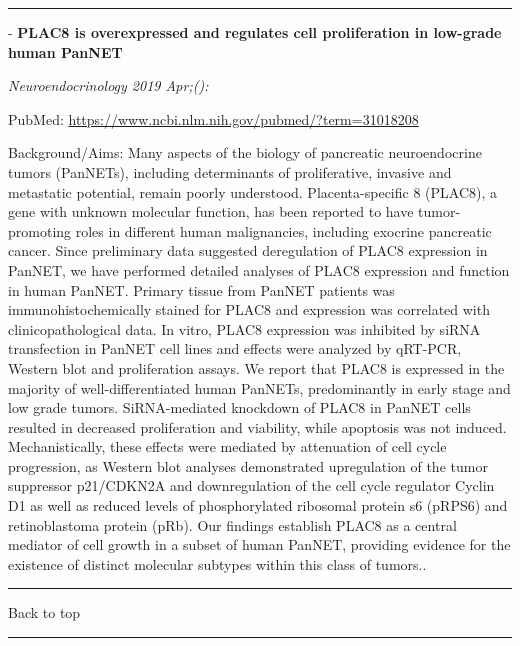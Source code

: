 \documentclass[]{article}
\begin{document}
{}

{}

\begin{center}\rule{0.5\linewidth}{\linethickness}\end{center}

 - \textbf{PLAC8 is overexpressed and regulates cell proliferation in
low-grade human PanNET}

\emph{Neuroendocrinology 2019 Apr;():}

PubMed: \url{https://www.ncbi.nlm.nih.gov/pubmed/?term=31018208}

Background/Aims: Many aspects of the biology of pancreatic
neuroendocrine tumors (PanNETs), including determinants of
proliferative, invasive and metastatic potential, remain poorly
understood. Placenta-specific 8 (PLAC8), a gene with unknown molecular
function, has been reported to have tumor-promoting roles in different
human malignancies, including exocrine pancreatic cancer. Since
preliminary data suggested deregulation of PLAC8 expression in PanNET,
we have performed detailed analyses of PLAC8 expression and function in
human PanNET. Primary tissue from PanNET patients was
immunohistochemically stained for PLAC8 and expression was correlated
with clinicopathological data. In vitro, PLAC8 expression was inhibited
by siRNA transfection in PanNET cell lines and effects were analyzed by
qRT-PCR, Western blot and proliferation assays. We report that PLAC8 is
expressed in the majority of well-differentiated human PanNETs,
predominantly in early stage and low grade tumors. SiRNA-mediated
knockdown of PLAC8 in PanNET cells resulted in decreased proliferation
and viability, while apoptosis was not induced. Mechanistically, these
effects were mediated by attenuation of cell cycle progression, as
Western blot analyses demonstrated upregulation of the tumor suppressor
p21/CDKN2A and downregulation of the cell cycle regulator Cyclin D1 as
well as reduced levels of phosphorylated ribosomal protein s6 (pRPS6)
and retinoblastoma protein (pRb). Our findings establish PLAC8 as a
central mediator of cell growth in a subset of human PanNET, providing
evidence for the existence of distinct molecular subtypes within this
class of tumors..

{}

{}

\begin{center}\rule{0.5\linewidth}{\linethickness}\end{center}

Back to top

\begin{center}\rule{0.5\linewidth}{\linethickness}\end{center}

\pagebreak
\end{document}
